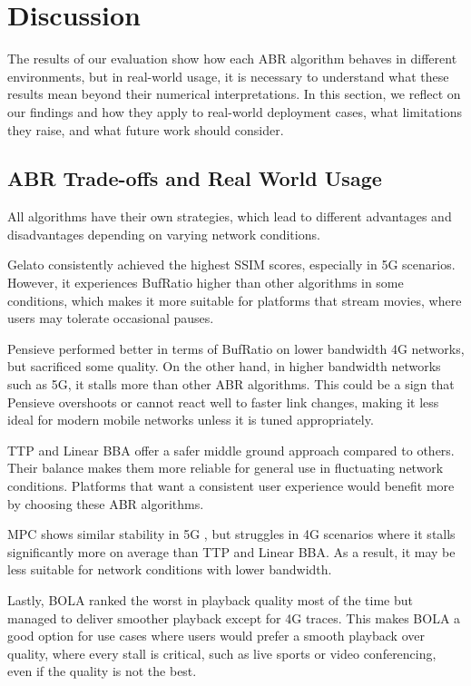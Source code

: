 \section{Discussion}\label{s:discussion}

The results of our evaluation show how each ABR algorithm behaves in different environments, but in real-world usage, it is necessary to understand what these results mean beyond their numerical interpretations. In this section, we reflect on our findings and how they apply to real-world deployment cases, what limitations they raise, and what future work should consider.

\subsection*{ABR Trade-offs and Real World Usage}

All algorithms have their own strategies, which lead to different advantages and disadvantages depending on varying network conditions.

Gelato consistently achieved the highest SSIM scores, especially in 5G scenarios. However, it experiences BufRatio higher than other algorithms in some conditions, which makes it more suitable for platforms that stream movies, where users may tolerate occasional pauses.

Pensieve performed better in terms of BufRatio on lower bandwidth 4G networks, but sacrificed some quality. On the other hand, in higher bandwidth networks such as 5G, it stalls more than other ABR algorithms. This could be a sign that Pensieve overshoots or cannot react well to faster link changes, making it less ideal for modern mobile networks unless it is tuned appropriately.

TTP and Linear BBA offer a safer middle ground approach compared to others. Their balance makes them more reliable for general use in fluctuating network conditions. Platforms that want a consistent user experience would benefit more by choosing these ABR algorithms. 

MPC shows similar stability in 5G , but struggles in 4G scenarios where it stalls significantly more on average than TTP and Linear BBA. As a result, it may be less suitable for network conditions with lower bandwidth.

Lastly, BOLA ranked the worst in playback quality most of the time but managed to deliver smoother playback except for 4G traces. This makes BOLA a good option for use cases where users would prefer a smooth playback over quality, where every stall is critical, such as live sports or video conferencing, even if the quality is not the best.


